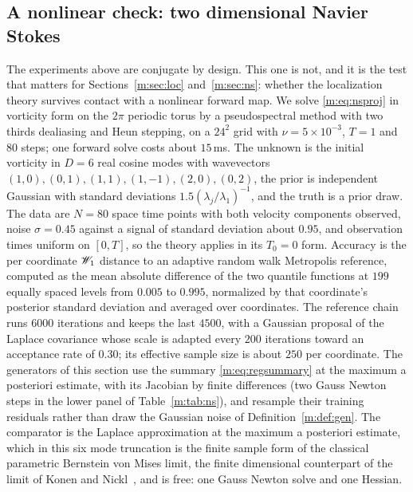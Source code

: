 \subsection{A nonlinear check: two dimensional Navier Stokes}\label{m:sec:expns}

The experiments above are conjugate by design. This one is not, and it is the test that matters for Sections~\ref{m:sec:loc} and~\ref{m:sec:ns}: whether the localization theory survives contact with a nonlinear forward map. We solve \eqref{m:eq:nsproj} in vorticity form on the $2\pi$ periodic torus by a pseudospectral method with two thirds dealiasing and Heun stepping, on a $24^2$ grid with $\nu=5\times10^{-3}$, $T=1$ and $80$ steps; one forward solve costs about $15$\,ms. The unknown is the initial vorticity in $D=6$ real cosine modes with wavevectors $(1,0),(0,1),(1,1),(1,-1),(2,0),(0,2)$, the prior is independent Gaussian with standard deviations $1.5(\lambda_j/\lambda_1)^{-1}$, and the truth is a prior draw. The data are $N=80$ space time points with both velocity components observed, noise $\sigma=0.45$ against a signal of standard deviation about $0.95$, and observation times uniform on $[0,T]$, so the theory applies in its $T_0=0$ form. Accuracy is the per coordinate $\mathscr{W}_1$ distance to an adaptive random walk Metropolis reference, computed as the mean absolute difference of the two quantile functions at $199$ equally spaced levels from $0.005$ to $0.995$, normalized by that coordinate's posterior standard deviation and averaged over coordinates. The reference chain runs $6000$ iterations and keeps the last $4500$, with a Gaussian proposal of the Laplace covariance whose scale is adapted every $200$ iterations toward an acceptance rate of $0.30$; its effective sample size is about $250$ per coordinate. The generators of this section use the summary \eqref{m:eq:regsummary} at the maximum a posteriori estimate, with its Jacobian by finite differences (two Gauss Newton steps in the lower panel of Table~\ref{m:tab:ns}), and resample their training residuals rather than draw the Gaussian noise of Definition~\ref{m:def:gen}. The comparator is the Laplace approximation at the maximum a posteriori estimate, which in this six mode truncation is the finite sample form of the classical parametric Bernstein von Mises limit, the finite dimensional counterpart of the limit of Konen and Nickl~\cite{konennickl2026}, and is free: one Gauss Newton solve and one Hessian.

